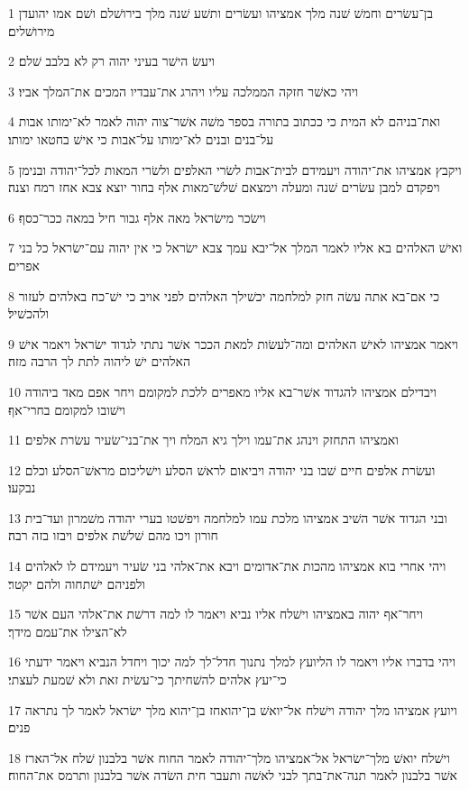 \par 1 בן־עשׂרים וחמשׁ שׁנה מלך אמציהו ועשׂרים ותשׁע שׁנה מלך בירושׁלם ושׁם אמו יהועדן מירושׁלים׃
\par 2 ויעשׂ הישׁר בעיני יהוה רק לא בלבב שׁלם׃
\par 3 ויהי כאשׁר חזקה הממלכה עליו ויהרג את־עבדיו המכים את־המלך אביו׃
\par 4 ואת־בניהם לא המית כי ככתוב בתורה בספר משׁה אשׁר־צוה יהוה לאמר לא־ימותו אבות על־בנים ובנים לא־ימותו על־אבות כי אישׁ בחטאו ימותו׃
\par 5 ויקבץ אמציהו את־יהודה ויעמידם לבית־אבות לשׂרי האלפים ולשׂרי המאות לכל־יהודה ובנימן ויפקדם למבן עשׂרים שׁנה ומעלה וימצאם שׁלשׁ־מאות אלף בחור יוצא צבא אחז רמח וצנה׃
\par 6 וישׂכר מישׂראל מאה אלף גבור חיל במאה ככר־כסף׃
\par 7 ואישׁ האלהים בא אליו לאמר המלך אל־יבא עמך צבא ישׂראל כי אין יהוה עם־ישׂראל כל בני אפרים׃
\par 8 כי אם־בא אתה עשׂה חזק למלחמה יכשׁילך האלהים לפני אויב כי ישׁ־כח באלהים לעזור ולהכשׁיל׃
\par 9 ויאמר אמציהו לאישׁ האלהים ומה־לעשׂות למאת הככר אשׁר נתתי לגדוד ישׂראל ויאמר אישׁ האלהים ישׁ ליהוה לתת לך הרבה מזה׃
\par 10 ויבדילם אמציהו להגדוד אשׁר־בא אליו מאפרים ללכת למקומם ויחר אפם מאד ביהודה וישׁובו למקומם בחרי־אף׃
\par 11 ואמציהו התחזק וינהג את־עמו וילך גיא המלח ויך את־בני־שׂעיר עשׂרת אלפים׃
\par 12 ועשׂרת אלפים חיים שׁבו בני יהודה ויביאום לראשׁ הסלע וישׁליכום מראשׁ־הסלע וכלם נבקעו׃
\par 13 ובני הגדוד אשׁר השׁיב אמציהו מלכת עמו למלחמה ויפשׁטו בערי יהודה משׁמרון ועד־בית חורון ויכו מהם שׁלשׁת אלפים ויבזו בזה רבה׃
\par 14 ויהי אחרי בוא אמציהו מהכות את־אדומים ויבא את־אלהי בני שׂעיר ויעמידם לו לאלהים ולפניהם ישׁתחוה ולהם יקטר׃
\par 15 ויחר־אף יהוה באמציהו וישׁלח אליו נביא ויאמר לו למה דרשׁת את־אלהי העם אשׁר לא־הצילו את־עמם מידך׃
\par 16 ויהי בדברו אליו ויאמר לו הליועץ למלך נתנוך חדל־לך למה יכוך ויחדל הנביא ויאמר ידעתי כי־יעץ אלהים להשׁחיתך כי־עשׂית זאת ולא שׁמעת לעצתי׃
\par 17 ויועץ אמציהו מלך יהודה וישׁלח אל־יואשׁ בן־יהואחז בן־יהוא מלך ישׂראל לאמר לך נתראה פנים׃
\par 18 וישׁלח יואשׁ מלך־ישׂראל אל־אמציהו מלך־יהודה לאמר החוח אשׁר בלבנון שׁלח אל־הארז אשׁר בלבנון לאמר תנה־את־בתך לבני לאשׁה ותעבר חית השׂדה אשׁר בלבנון ותרמס את־החוח׃
